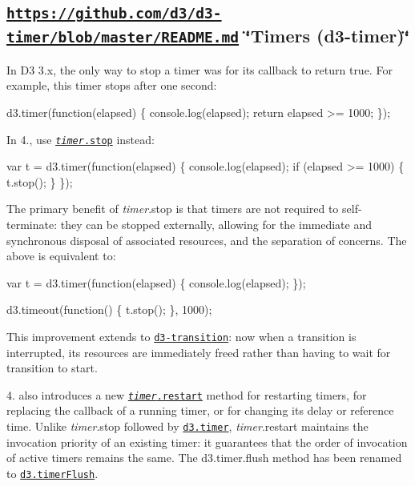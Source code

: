 \subsection*{\href{https://github.com/d3/d3-timer/blob/master/README.md}{\tt https\+://github.\+com/d3/d3-\/timer/blob/master/\+R\+E\+A\+D\+M\+E.\+md} \char`\"{}\+Timers (d3-\/timer)\char`\"{}}

In D3 3.\+x, the only way to stop a timer was for its callback to return true. For example, this timer stops after one second\+:


\begin{DoxyCode}
d3.timer(function(elapsed) \{
  console.log(elapsed);
  return elapsed >= 1000;
\});
\end{DoxyCode}


In 4., use \href{https://github.com/d3/d3-timer/blob/master/README.md#timer_stop}{\tt {\itshape timer}.stop} instead\+:


\begin{DoxyCode}
var t = d3.timer(function(elapsed) \{
  console.log(elapsed);
  if (elapsed >= 1000) \{
    t.stop();
  \}
\});
\end{DoxyCode}


The primary benefit of {\itshape timer}.stop is that timers are not required to self-\/terminate\+: they can be stopped externally, allowing for the immediate and synchronous disposal of associated resources, and the separation of concerns. The above is equivalent to\+:


\begin{DoxyCode}
var t = d3.timer(function(elapsed) \{
  console.log(elapsed);
\});

d3.timeout(function() \{
  t.stop();
\}, 1000);
\end{DoxyCode}


This improvement extends to \href{#transitions-d3-transition}{\tt d3-\/transition}\+: now when a transition is interrupted, its resources are immediately freed rather than having to wait for transition to start.

4. also introduces a new \href{https://github.com/d3/d3-timer/blob/master/README.md#timer_restart}{\tt {\itshape timer}.restart} method for restarting timers, for replacing the callback of a running timer, or for changing its delay or reference time. Unlike {\itshape timer}.stop followed by \href{https://github.com/d3/d3-timer/blob/master/README.md#timer}{\tt d3.\+timer}, {\itshape timer}.restart maintains the invocation priority of an existing timer\+: it guarantees that the order of invocation of active timers remains the same. The d3.\+timer.\+flush method has been renamed to \href{https://github.com/d3/d3-timer/blob/master/README.md#timerFlush}{\tt d3.\+timer\+Flush}.

